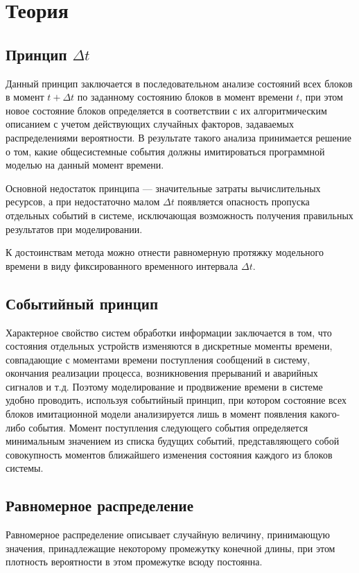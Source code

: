\documentclass[12pt]{report}
\begin{document}
\section*{Теория}
\subsection*{Принцип $\Delta t$}
Данный принцип заключается в последовательном анализе состояний всех блоков в момент $t + \Delta t$ по заданному состоянию блоков в момент времени $t$, при этом новое состояние блоков определяется в соответствии с их алгоритмическим описанием с учетом действующих случайных факторов, задаваемых распределениями вероятности. В результате такого анализа принимается решение о том, какие общесистемные события должны имитироваться программной моделью на данный момент времени.

Основной недостаток принципа --- значительные затраты вычислительных ресурсов, а при недостаточно малом $\Delta t$ появляется опасность пропуска отдельных событий в системе, исключающая возможность получения правильных результатов при моделировании.

К достоинствам метода можно отнести равномерную протяжку модельного времени в виду фиксированного временного интервала $\Delta t$.

\subsection*{Событийный принцип}
Характерное свойство систем обработки информации заключается в том, что состояния отдельных устройств изменяются в дискретные моменты времени, совпадающие с моментами времени поступления сообщений в систему, окончания реализации процесса, возникновения прерываний и аварийных сигналов и т.д. Поэтому моделирование и продвижение времени в системе удобно проводить, используя событийный принцип, при котором состояние всех блоков имитационной модели анализируется лишь в момент появления какого-либо события. Момент поступления следующего события определяется минимальным значением из списка будущих событий, представляющего собой совокупность моментов ближайшего изменения состояния каждого из блоков системы.


\subsection*{Равномерное распределение}
Равномерное распределение описывает случайную величину, принимающую значения, принадлежащие некоторому промежутку конечной длины, при этом плотность вероятности в этом промежутке всюду постоянна.
\newline
\end{document}
